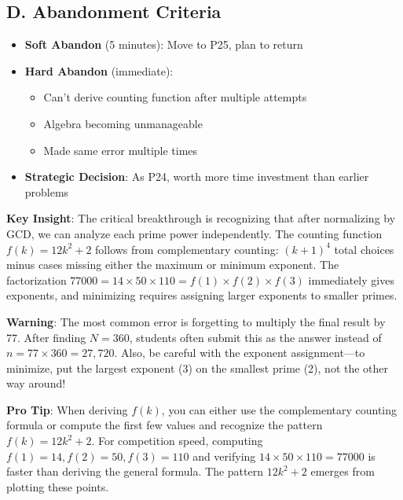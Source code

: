 \documentclass[11pt]{article}
\begin{document}
\begin{competitionbox}
\subsection*{D. Abandonment Criteria}
\begin{itemize}[leftmargin=*]
    \item \textbf{Soft Abandon} (5 minutes): Move to P25, plan to return
    \item \textbf{Hard Abandon} (immediate):
    \begin{itemize}
        \item Can't derive counting function after multiple attempts
        \item Algebra becoming unmanageable
        \item Made same error multiple times
    \end{itemize}
    \item \textbf{Strategic Decision}: As P24, worth more time investment than earlier problems
\end{itemize}
\end{competitionbox}

\begin{keyinsightbox}
\textbf{Key Insight}: The critical breakthrough is recognizing that after normalizing by GCD, we can analyze each prime power independently. The counting function $f(k) = 12k^2 + 2$ follows from complementary counting: $(k+1)^4$ total choices minus cases missing either the maximum or minimum exponent. The factorization $77000 = 14 \times 50 \times 110 = f(1) \times f(2) \times f(3)$ immediately gives exponents, and minimizing requires assigning larger exponents to smaller primes.
\end{keyinsightbox}

\begin{warningbox}
\textbf{Warning}: The most common error is forgetting to multiply the final result by 77. After finding $N = 360$, students often submit this as the answer instead of $n = 77 \times 360 = 27,720$. Also, be careful with the exponent assignment—to minimize, put the largest exponent (3) on the smallest prime (2), not the other way around!
\end{warningbox}

\begin{tipbox}
\textbf{Pro Tip}: When deriving $f(k)$, you can either use the complementary counting formula or compute the first few values and recognize the pattern $f(k) = 12k^2 + 2$. For competition speed, computing $f(1) = 14, f(2) = 50, f(3) = 110$ and verifying $14 \times 50 \times 110 = 77000$ is faster than deriving the general formula. The pattern $12k^2 + 2$ emerges from plotting these points.
\end{tipbox}
\end{document}
